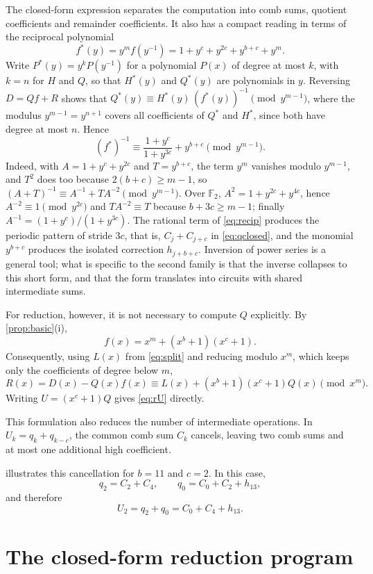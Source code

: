 \documentclass{ieeeaccess}
\theoremstyle{plain}
\theoremstyle{definition}
\newcommand{\F}{\mathbb{F}}
\begin{document}
The closed-form expression separates the computation into comb sums, quotient
coefficients and remainder coefficients. It also has a compact reading in terms
of the reciprocal polynomial
\[
  f^*(y)=y^mf(y^{-1})=1+y^c+y^{2c}+y^{b+c}+y^m.
\]
Write $P^*(y)=y^kP(y^{-1})$ for a polynomial $P(x)$ of degree at most $k$, with
$k=n$ for $H$ and $Q$, so that $H^*(y)$ and $Q^*(y)$ are polynomials in $y$. Reversing
$D=Qf+R$ shows that $Q^*(y)\equiv H^*(y)\,(f^*(y))^{-1}\pmod{y^{m-1}}$, where the modulus
$y^{m-1}=y^{n+1}$ covers all coefficients of $Q^*$ and $H^*$, since both have degree at most $n$. Hence
\begin{equation}\label{eq:recip}
  (f^*)^{-1}\equiv\frac{1+y^c}{1+y^{3c}}+y^{b+c}\pmod{y^{m-1}}.
\end{equation}
Indeed, with $A=1+y^c+y^{2c}$ and $T=y^{b+c}$, the term $y^m$ vanishes modulo
$y^{m-1}$, and $T^2$ does too because $2(b+c)\ge m-1$, so
$(A+T)^{-1}\equiv A^{-1}+TA^{-2}\pmod{y^{m-1}}$. Over $\F_2$, $A^2=1+y^{2c}+y^{4c}$, hence
$A^{-2}\equiv1\pmod{y^{2c}}$ and $TA^{-2}\equiv T$ because $b+3c\ge m-1$;
finally $A^{-1}=(1+y^c)/(1+y^{3c})$. The rational term of \eqref{eq:recip}
produces the periodic pattern of stride $3c$, that is, $C_j+C_{j+c}$ in
\eqref{eq:qclosed}, and the monomial $y^{b+c}$ produces the isolated correction
$h_{j+b+c}$. Inversion of power series is a general tool; what is specific to
the second family is that the inverse collapses to this short form, and that the
form translates into circuits with shared intermediate sums.

For reduction, however, it is not necessary to compute $Q$ explicitly. By
\cref{prop:basic}(i),
\[
  f(x)=x^m+(x^b+1)(x^c+1).
\]
Consequently, using $L(x)$ from \eqref{eq:split} and reducing modulo $x^m$, which keeps
only the coefficients of degree below $m$,
\[
  R(x)=D(x)-Q(x)f(x)
   \equiv L(x)+(x^b+1)(x^c+1)Q(x)
   \pmod{x^m}.
\]
Writing $U=(x^c+1)Q$ gives \eqref{eq:rU} directly.

This formulation also reduces the number of intermediate operations. In
$U_k=q_k+q_{k-c}$, the common comb sum $C_k$ cancels, leaving two comb sums and
at most one additional high coefficient.

 illustrates this cancellation for $b=11$ and $c=2$. In this
case,
\[
  q_2=C_2+C_4,\qquad
  q_0=C_0+C_2+h_{13},
\]
and therefore
\[
  U_2=q_2+q_0=C_0+C_4+h_{13}.
\]


\section{The closed-form reduction program}\label{sec:program}
\end{document}
